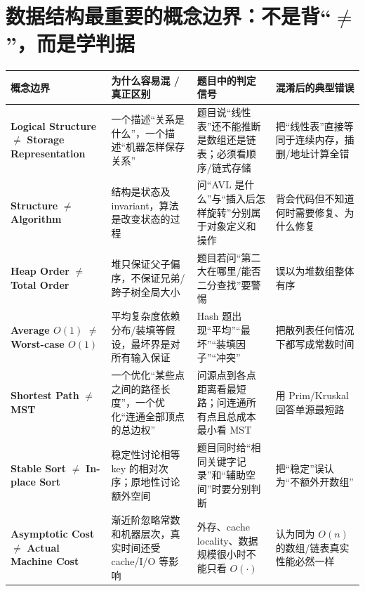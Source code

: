 \documentclass[11pt,a4paper,openany]{ctexbook}
\newcommand{\key}[1]{\textbf{\color{deep}#1}}
\begin{document}
\section{数据结构最重要的概念边界：不是背“$\neq$”，而是学判据}
\begin{longtable}{L{3.6cm}L{4.2cm}L{4.0cm}L{\dimexpr\linewidth-13.07cm\relax}}
\toprule
\textbf{概念边界} & \textbf{为什么容易混 / 真正区别} & \textbf{题目中的判定信号} & \textbf{混淆后的典型错误}\\
\midrule
\key{Logical Structure} $\neq$ \key{Storage Representation} & 一个描述“关系是什么”，一个描述“机器怎样保存关系” & 题目说“线性表”还不能推断是数组还是链表；必须看顺序/链式存储 & 把“线性表”直接等同于连续内存，插删/地址计算全错 \\
\midrule
\key{Structure} $\neq$ \key{Algorithm} & 结构是状态及 invariant，算法是改变状态的过程 & 问“AVL 是什么”与“插入后怎样旋转”分别属于对象定义和操作 & 背会代码但不知道何时需要修复、为什么修复 \\
\midrule
\key{Heap Order} $\neq$ \key{Total Order} & 堆只保证父子偏序，不保证兄弟/跨子树全局大小 & 题目若问“第二大在哪里/能否二分查找”要警惕 & 误以为堆数组整体有序 \\
\midrule
\key{Average $O(1)$} $\neq$ \key{Worst-case $O(1)$} & 平均复杂度依赖分布/装填等假设，最坏界是对所有输入保证 & Hash 题出现“平均”“最坏”“装填因子”“冲突” & 把散列表任何情况下都写成常数时间 \\
\midrule
\key{Shortest Path} $\neq$ \key{MST} & 一个优化“某些点之间的路径长度”，一个优化“连通全部顶点的总边权” & 问源点到各点距离看最短路；问连通所有点且总成本最小看 MST & 用 Prim/Kruskal 回答单源最短路 \\
\midrule
\key{Stable Sort} $\neq$ \key{In-place Sort} & 稳定性讨论相等 key 的相对次序；原地性讨论额外空间 & 题目同时给“相同关键字记录”和“辅助空间”时要分别判断 & 把“稳定”误认为“不额外开数组” \\
\midrule
\key{Asymptotic Cost} $\neq$ \key{Actual Machine Cost} & 渐近阶忽略常数和机器层次，真实时间还受 cache/I/O 等影响 & 外存、cache locality、数据规模很小时不能只看 $O(\cdot)$ & 认为同为 $O(n)$ 的数组/链表真实性能必然一样 \\
\bottomrule
\end{longtable}
\end{document}
